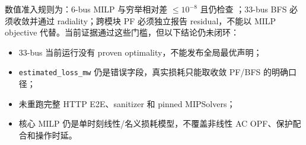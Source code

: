 数值准入规则为：6-bus MILP 与穷举相对差 $\le10^{-8}$ 且仍检查
；33-bus BFS 必须收敛并通过 radiality；跨模块 PF 必须独立报告
residual，不能以 MILP objective 代替。当前证据通过这些门槛，但以下结论仍未闭环：
\begin{itemize}
  \item 33-bus 当前运行没有 proven optimality，不能发布全局最优声明；
  \item \texttt{estimated\_loss\_mw} 仍是错误字段，真实损耗只能取收敛 PF/BFS 的明确口径；
  \item 未重跑完整 HTTP E2E、sanitizer 和 pinned MIPSolvers；
  \item 核心 MILP 仍是单时刻线性/名义损耗模型，不覆盖非线性 AC OPF、保护配合和操作时延。
\end{itemize}

